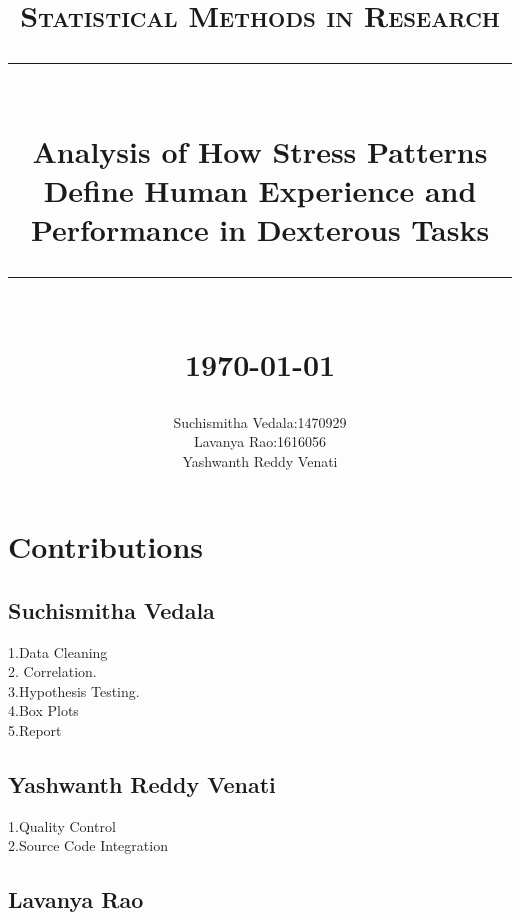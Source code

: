 \documentclass[12pt,epsf]{report}
\newcommand{\HRule}[1]{\rule{\linewidth}{#1}}
\begin{document}
\title{ \large \textsc{Statistical Methods in Research}
		\\ [2.0cm]
		\HRule{1pt} \\
		\LARGE \textbf{{Analysis of How Stress Patterns Define Human Experience and Performance in Dexterous Tasks}}
		\HRule{1pt} \\ [0.5cm]
		\normalsize \today \vspace*{5\baselineskip}}

\date{}

\author{
		Suchismitha Vedala:1470929 \\ 
		Lavanya Rao:1616056 \\
		Yashwanth Reddy Venati }

\maketitle
\tableofcontents
\newpage
\section*{Contributions}
\subsection*{Suchismitha Vedala}
1.Data Cleaning\\
2. Correlation.\\
3.Hypothesis Testing.\\
4.Box Plots\\
5.Report\\
\subsection*{Yashwanth Reddy Venati}
1.Quality Control\\
2.Source Code Integration\\
\subsection*{Lavanya Rao}
\newpage
\sectionfont{ \scshape}
\subsectionfont{\centering}

\end{document}
